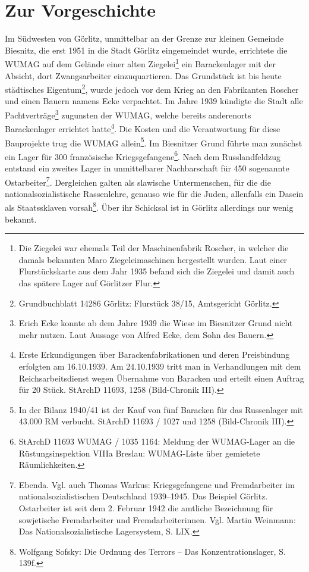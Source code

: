 \section{Zur Vorgeschichte}
Im Südwesten von Görlitz, unmittelbar an der Grenze zur kleinen Gemeinde Biesnitz, die erst 1951 in die Stadt Görlitz eingemeindet wurde, errichtete die WUMAG auf dem Gelände einer alten Ziegelei\footnote{Die Ziegelei war ehemals Teil der Maschinenfabrik Roscher, in welcher die damals bekannten Maro Ziegeleimaschinen hergestellt wurden. Laut einer Flurstückskarte aus dem Jahr 1935 befand sich die Ziegelei und damit auch das spätere Lager auf Görlitzer Flur.} ein Barackenlager mit der Absicht, dort Zwangsarbeiter einzuquartieren. Das Grundstück ist bis heute städtisches Eigentum\footnote{Grundbuchblatt 14286 Görlitz: Flurstück 38/15, Amtsgericht Görlitz.}, wurde jedoch vor dem Krieg an den Fabrikanten Roscher und einen Bauern namens Ecke verpachtet.
Im Jahre 1939 kündigte die Stadt alle Pachtverträge\footnote{Erich Ecke konnte ab dem Jahre 1939 die Wiese im Biesnitzer Grund nicht mehr nutzen. Laut Aussage von Alfred Ecke, dem Sohn des Bauern.} zugunsten der WUMAG, welche bereits anderenorts Barackenlager errichtet hatte\footnote{Erste Erkundigungen über Barackenfabrikationen und deren Preisbindung erfolgten am 16.10.1939. Am 24.10.1939 tritt man in Verhandlungen mit dem Reichsarbeitsdienst wegen Übernahme von Baracken und erteilt einen Auftrag für 20 Stück. StArchD 11693, 1258 (Bild-Chronik III).}. Die Kosten und die Verantwortung für diese Bauprojekte trug die WUMAG allein\footnote{In der Bilanz 1940/41 ist der Kauf von fünf Baracken für das Russenlager mit 43.000 RM verbucht. StArchD 11693 / 1027 und 1258 (Bild-Chronik III).}. Im Biesnitzer Grund führte man zunächst ein Lager für 300 französische Kriegsgefangene\footnote{StArchD 11693 WUMAG / 1035 1164: Meldung der WUMAG-Lager an die Rüstungsinspektion VIIIa Breslau: WUMAG-Liste über gemietete Räumlichkeiten.}.
Nach dem Russlandfeldzug entstand ein zweites Lager in unmittelbarer Nachbarschaft für 450 sogenannte \glqq Ostarbeiter\grqq\footnote{Ebenda. Vgl. auch Thomas Warkus: Kriegsgefangene und Fremdarbeiter im nationalsozialistischen Deutschland 1939--1945. Das Beispiel Görlitz. Ostarbeiter ist seit dem 2. Februar 1942 die amtliche Bezeichnung für sowjetische Fremdarbeiter und Fremdarbeiterinnen. Vgl. Martin Weinmann: Das Nationalsozialistische Lagersystem, S. LIX.}. Dergleichen galten als slawische Untermenschen, für die die nationalsozialistische Rassenlehre, genauso wie für die Juden, allenfalls ein Dasein als Staatssklaven vorsah\footnote{Wolfgang Sofsky: Die Ordnung des Terrors -- Das Konzentrationslager, S. 139f.}. Über ihr Schicksal ist in Görlitz allerdings nur wenig bekannt.
